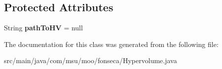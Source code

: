 \subsection*{Protected Attributes}
\begin{DoxyCompactItemize}
\item 
\hypertarget{classcom_1_1msu_1_1moo_1_1fonseca_1_1Hypervolume_ab46095cd7c8a905b334478665996ce1f}{String {\bfseries path\-To\-H\-V} = null}\label{classcom_1_1msu_1_1moo_1_1fonseca_1_1Hypervolume_ab46095cd7c8a905b334478665996ce1f}

\end{DoxyCompactItemize}


The documentation for this class was generated from the following file\-:\begin{DoxyCompactItemize}
\item 
src/main/java/com/msu/moo/fonseca/Hypervolume.\-java\end{DoxyCompactItemize}
